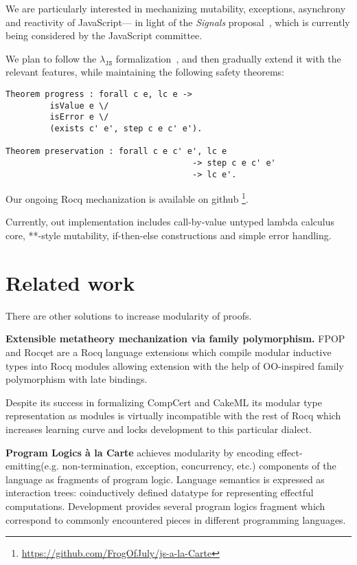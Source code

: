\documentclass[sigplan,nonacm]{acmart}
\begin{document}
We are particularly interested in mechanizing
mutability, exceptions, asynchrony and reactivity of JavaScript---%
in light of the \emph{Signals} proposal~\cite{signals-proposal-t39},
which is currently being considered by the JavaScript committee.

We plan to follow the $\lambda_{\texttt{JS}}$ formalization~\cite{guha2010essence},
and then gradually extend it with the relevant features,
while maintaining the following safety theorems:

\begin{lstlisting}[numbers=none, language=Coq]
Theorem progress : forall c e, lc e -> 
         isValue e \/ 
         isError e \/ 
         (exists c' e', step c e c' e').

Theorem preservation : forall c e c' e', lc e
                                      -> step c e c' e'
                                      -> lc e'.
\end{lstlisting}

Our ongoing Rocq mechanization is available on github \footnote{\url{https://github.com/FrogOfJuly/js-a-la-Carte}}. 

Currently, out implementation includes call-by-value untyped lambda calculus core, **-style mutability, if-then-else constructions and simple error handling. 


\section{Related work}

There are other solutions to increase modularity of proofs. 

\medskip

\textbf{Extensible metatheory mechanization via family polymorphism. } FPOP\cite{jin2023extensible} and Rocqet\cite{ebresafe2025certified} are a Rocq language extensions which compile modular inductive types into Rocq modules allowing extension with the help of 
OO-inspired family polymorphism with late bindings. 

Despite its success in formalizing CompCert and CakeML its modular type representation as modules is virtually incompatible with the rest of Rocq which increases learning curve and locks development to this particular dialect. 

\medskip
\textbf{Program Logics à la Carte}\cite{vistrup2025program} achieves modularity by encoding effect-emitting(e.g. non-termination, exception, concurrency, etc.) components of the language as fragments of program logic. 
Language semantics is expressed as interaction trees\cite{xia2019interaction}: coinductively defined datatype for representing effectful computations. 
Development provides several program logics fragment which correspond to commonly encountered pieces in different programming languages. 
\end{document}
